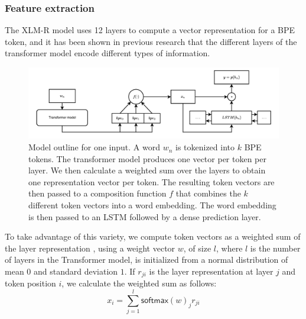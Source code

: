 \documentclass[11pt]{article}
\newcommand\adam[1]{(\textbf{Adam:} #1)}
\newcommand\citep{\cite}
\newcommand\softmax{\mathsf{softmax}}
\begin{document}
	\subsubsection{Feature extraction}
        \label{sec:bpe-features}

    The XLM-R model uses 12 layers to compute a vector representation
     for a BPE token, and it has been shown in previous research
     \citep{kondratyukstraka,raganato2018analysis,liu2019linguistic}
     that the different layers of the transformer model encode
     different types of information.


    \begin{figure}%
    \centering
	\includegraphics[scale=0.5]{single-step-final.pdf}
            \caption{\label{fig:model} Model outline for one input. A
     word $w_n$ is tokenized into $k$ BPE tokens. The transformer
     model produces one vector per token per layer.  We then calculate
     a weighted sum over the layers to obtain one representation
     vector per token.  The resulting token vectors are then passed to
     a composition function $f$ that combines the $k$ different token
     vectors into a word embedding. The word embedding is then passed
     to an LSTM followed by a dense prediction layer. }
	\end{figure}

                    To take advantage of this variety, we compute token
     vectors as a weighted sum of the layer representation
     \citep{kondratyukstraka}, using a weight vector $w$, of size
     $l$, where $l$ is the number of layers in the Transformer model,
     is initialized from a normal distribution of mean $0$ and
     standard deviation $1$. If $r_{ji}$ is the layer representation
     at layer $j$ and token position $i$, we calculate the weighted
     sum as follows:
    \begin{equation}
		x_i = \sum_{j=1}^{l} \softmax(w)_j r_{ji}
	\end{equation}
\end{document}
